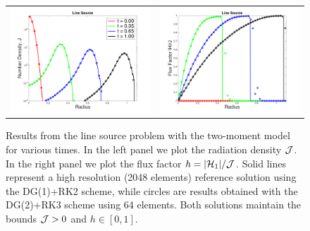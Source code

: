 \documentclass[10pt,preprint]{aastex}
\begin{document}
\begin{figure}
  \begin{center}
    \begin{tabular}{cc}
      \includegraphics[scale=0.4]{./Figures/LineSource1D_Density.png} &
      \includegraphics[scale=0.4]{./Figures/LineSource1D_FluxFactor.png}
    \end{tabular}
  \end{center}
  \caption{Results from the line source problem with the two-moment model for various times.  In the left panel we plot the radiation density $\mathcal{J}$.  In the right panel we plot the flux factor $h=|\mathcal{H}_{1}|/\mathcal{J}$.  Solid lines represent a high resolution (2048 elements) reference solution using the DG(1)+RK2 scheme, while circles are results obtained with the DG(2)+RK3 scheme using 64 elements.  Both solutions maintain the bounds $\mathcal{J}>0$ and $h\in[0,1]$.}
  \label{fig:lineSource}
\end{figure}
\end{document}
